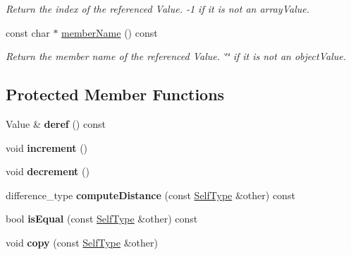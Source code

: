 \begin{DoxyCompactItemize}
\begin{DoxyCompactList}\small\item\em Return the index of the referenced Value. -\/1 if it is not an array\-Value. \end{DoxyCompactList}\item 
\hypertarget{class_json_1_1_value_iterator_base_ac71f27274c0326832dedec3060133a0d}{const char $\ast$ \hyperlink{class_json_1_1_value_iterator_base_ac71f27274c0326832dedec3060133a0d}{member\-Name} () const }\label{class_json_1_1_value_iterator_base_ac71f27274c0326832dedec3060133a0d}

\begin{DoxyCompactList}\small\item\em Return the member name of the referenced Value. \char`\"{}\char`\"{} if it is not an object\-Value. \end{DoxyCompactList}\end{DoxyCompactItemize}
\subsection*{Protected Member Functions}
\begin{DoxyCompactItemize}
\item 
\hypertarget{class_json_1_1_value_iterator_base_a4ca11f1e5a984554b79fc98dd69577c0}{Value \& {\bfseries deref} () const }\label{class_json_1_1_value_iterator_base_a4ca11f1e5a984554b79fc98dd69577c0}

\item 
\hypertarget{class_json_1_1_value_iterator_base_a5ed55be0046592580110a79d16003c2b}{void {\bfseries increment} ()}\label{class_json_1_1_value_iterator_base_a5ed55be0046592580110a79d16003c2b}

\item 
\hypertarget{class_json_1_1_value_iterator_base_ab1a5b6694984a2c53567174126938d8c}{void {\bfseries decrement} ()}\label{class_json_1_1_value_iterator_base_ab1a5b6694984a2c53567174126938d8c}

\item 
\hypertarget{class_json_1_1_value_iterator_base_a79eff2632ecabafeb19aa74d066061fe}{difference\-\_\-type {\bfseries compute\-Distance} (const \hyperlink{class_json_1_1_value_iterator_base}{Self\-Type} \&other) const }\label{class_json_1_1_value_iterator_base_a79eff2632ecabafeb19aa74d066061fe}

\item 
\hypertarget{class_json_1_1_value_iterator_base_a1ffe2d20b6476f84e055aa1094fe70c6}{bool {\bfseries is\-Equal} (const \hyperlink{class_json_1_1_value_iterator_base}{Self\-Type} \&other) const }\label{class_json_1_1_value_iterator_base_a1ffe2d20b6476f84e055aa1094fe70c6}

\item 
\hypertarget{class_json_1_1_value_iterator_base_a938659a563d99d0199b655b3747367f2}{void {\bfseries copy} (const \hyperlink{class_json_1_1_value_iterator_base}{Self\-Type} \&other)}\label{class_json_1_1_value_iterator_base_a938659a563d99d0199b655b3747367f2}

\end{DoxyCompactItemize}


